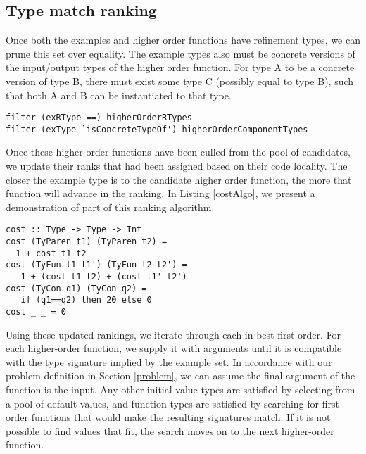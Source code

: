 \subsection{Type match ranking}\label{typeMatch}

Once both the examples and higher order functions have refinement types, we can prune this set over equality.
The example types also must be concrete versions of the input/output types of the higher order function.
For type A to be a concrete version of type B, there must exist some type C (possibly equal to type B), such that both A and B can be instantiated to that type.

\begin{lstlisting}[caption=Pruning based on types,label=costAlgo]
filter (exRType ==) higherOrderRTypes
filter (exType `isConcreteTypeOf') higherOrderComponentTypes
\end{lstlisting}


Once these higher order functions have been culled from the pool of candidates, we update their ranks that had been assigned based on their code locality.
The closer the example type is to the candidate higher order function, the more that function will advance in the ranking.
In Listing \ref{costAlgo}, we present a demonstration of part of this ranking algorithm.

\begin{lstlisting}[caption=Type closeness ranking algorithm,label=costAlgo]
cost :: Type -> Type -> Int
cost (TyParen t1) (TyParen t2) =
  1 + cost t1 t2
cost (TyFun t1 t1') (TyFun t2 t2') =
   1 + (cost t1 t2) + (cost t1' t2')
cost (TyCon q1) (TyCon q2) =
   if (q1==q2) then 20 else 0
cost _ _ = 0
\end{lstlisting}

Using these updated rankings, we iterate through each in best-first order. For each higher-order function, we supply it with arguments until it is compatible with the type signature implied by the example set. In accordance with our problem definition in Section \ref{problem}, we can assume the final argument of the function is the input. Any other initial value types are satisfied by selecting from a pool of default values, and function types are satisfied by searching for first-order functions that would make the resulting signatures match. If it is not possible to find values that fit, the search moves on to the next higher-order function.

